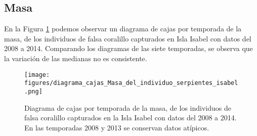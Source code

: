 \documentclass{article}
\begin{document}
\subsection*{Masa}
En la Figura \ref{fig:pngBoxsplotMasa} podemos observar un diagrama de cajas por temporada de la
masa, de los individuos de falsa coralillo capturados en Isla Isabel con datos del 2008 a 2014.
Comparando los diagramas de las siete temporadas, se observa  que la variación de las medianas no es
consistente.

\begin{figure}[H]
\centering
\texttt{[image: figures/diagrama\_cajas\_Masa\_del\_individuo\_serpientes\_isabel.png]}
\caption{Diagrama de cajas por temporada de la masa, de los individuos de falsa coralillo capturados en la Isla Isabel con datos del 2008 a 2014. En las temporadas 2008 y 2013 se conservan datos atípicos.}
\label{fig:pngBoxsplotMasa}
\end{figure}
\end{document}
